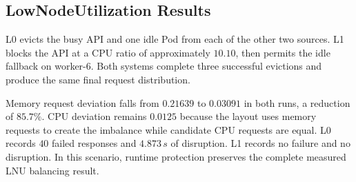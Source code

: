 \subsection{LowNodeUtilization Results}
\label{subsec:actualusage4_lnu_results}
\begin{table}[H]
    \centering
    \caption{LowNodeUtilization Results}
    \label{tab:actualusage4_lnu}
    \renewcommand{\arraystretch}{1.2}
\end{table}

L0 evicts the busy API and one idle Pod from each of the other two sources. L1 blocks the API at a CPU ratio of approximately \(10.10\), then permits the idle fallback on worker-6. Both systems complete three successful evictions and produce the same final request distribution.

Memory request deviation falls from \(0.21639\) to \(0.03091\) in both runs, a reduction of \(85.7\%\). CPU deviation remains \(0.0125\) because the layout uses memory requests to create the imbalance while candidate CPU requests are equal. L0 records \(40\) failed responses and \(4.873\,s\) of disruption. L1 records no failure and no disruption. In this scenario, runtime protection preserves the complete measured LNU balancing result.

